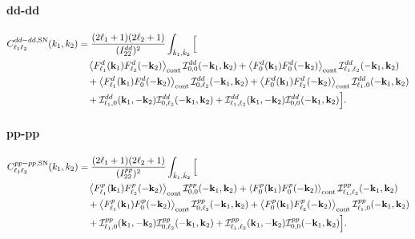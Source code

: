 \documentclass[a4paper,11pt]{article}
\begin{document}
\paragraph{dd-dd}
\begin{align}
C^{dd-dd,{\rm SN}}_{\ell_1\ell_2}(k_1,k_2)
&=
\frac{(2\ell_1+1)(2\ell_2+1)}
{(I^{dd}_{22})^2}
\int_{\hat k_1,\hat k_2}
\Big[
\nonumber\\
&\quad
\left\langle
F^d_{\ell_1}(\mathbf k_1)
F^d_{\ell_2}(-\mathbf k_2)
\right\rangle_{\rm cont}
\mathcal I^{dd}_{0,0}(-\mathbf k_1,\mathbf k_2)
+
\left\langle
F^d_{0}(\mathbf k_1)
F^d_{0}(-\mathbf k_2)
\right\rangle_{\rm cont}
\mathcal I^{dd}_{\ell_1,\ell_2}(-\mathbf k_1,\mathbf k_2)
\nonumber\\
&\quad+
\left\langle
F^d_{\ell_1}(\mathbf k_1)
F^d_{0}(-\mathbf k_2)
\right\rangle_{\rm cont}
\mathcal I^{dd}_{0,\ell_2}(-\mathbf k_1,\mathbf k_2)
+
\left\langle
F^d_{0}(\mathbf k_1)
F^d_{\ell_2}(-\mathbf k_2)
\right\rangle_{\rm cont}
\mathcal I^{dd}_{\ell_1,0}(-\mathbf k_1,\mathbf k_2)
\nonumber\\
&\quad+
\mathcal I^{dd}_{\ell_1,0}(\mathbf k_1,-\mathbf k_2)
\mathcal I^{dd}_{0,\ell_2}(-\mathbf k_1,\mathbf k_2)
+
\mathcal I^{dd}_{\ell_1,\ell_2}(\mathbf k_1,-\mathbf k_2)
\mathcal I^{dd}_{0,0}(-\mathbf k_1,\mathbf k_2)
\Big].
\end{align}

\paragraph{pp-pp}
\begin{align}
C^{pp-pp,{\rm SN}}_{\ell_1\ell_2}(k_1,k_2)
&=
\frac{(2\ell_1+1)(2\ell_2+1)}
{(I^{pp}_{22})^2}
\int_{\hat k_1,\hat k_2}
\Big[
\nonumber\\
&\quad
\left\langle
F^p_{\ell_1}(\mathbf k_1)
F^p_{\ell_2}(-\mathbf k_2)
\right\rangle_{\rm cont}
\mathcal I^{pp}_{0,0}(-\mathbf k_1,\mathbf k_2)
+
\left\langle
F^p_{0}(\mathbf k_1)
F^p_{0}(-\mathbf k_2)
\right\rangle_{\rm cont}
\mathcal I^{pp}_{\ell_1,\ell_2}(-\mathbf k_1,\mathbf k_2)
\nonumber\\
&\quad+
\left\langle
F^p_{\ell_1}(\mathbf k_1)
F^p_{0}(-\mathbf k_2)
\right\rangle_{\rm cont}
\mathcal I^{pp}_{0,\ell_2}(-\mathbf k_1,\mathbf k_2)
+
\left\langle
F^p_{0}(\mathbf k_1)
F^p_{\ell_2}(-\mathbf k_2)
\right\rangle_{\rm cont}
\mathcal I^{pp}_{\ell_1,0}(-\mathbf k_1,\mathbf k_2)
\nonumber\\
&\quad+
\mathcal I^{pp}_{\ell_1,0}(\mathbf k_1,-\mathbf k_2)
\mathcal I^{pp}_{0,\ell_2}(-\mathbf k_1,\mathbf k_2)
+
\mathcal I^{pp}_{\ell_1,\ell_2}(\mathbf k_1,-\mathbf k_2)
\mathcal I^{pp}_{0,0}(-\mathbf k_1,\mathbf k_2)
\Big].
\end{align}
\end{document}
